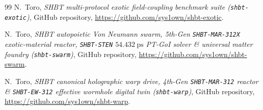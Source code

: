\begin{thebibliography}{99}
N.~Toro, \textit{SHBT multi-protocol exotic field-coupling benchmark suite (\texttt{shbt-exotic})}, GitHub repository, \url{https://github.com/sys1own/shbt-exotic}.

N.~Toro, \textit{SHBT autopoietic Von Neumann swarm, 5th-Gen \texttt{SHBT-MAR-312X} exotic-material reactor, \texttt{SHBT-STEN} $54.432~\mathrm{ps}$ PT-GoI solver \& universal matter foundry (\texttt{shbt-swarm})}, GitHub repository, \url{https://github.com/sys1own/shbt-swarm}.

N.~Toro, \textit{SHBT canonical holographic warp drive, 4th-Gen \texttt{SHBT-MAR-312} reactor \& \texttt{SHBT-EW-312} effective wormhole digital twin (\texttt{shbt-warp})}, GitHub repository, \url{https://github.com/sys1own/shbt-warp}.

\end{thebibliography}
